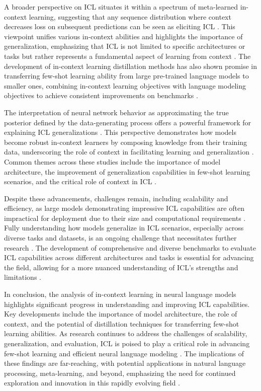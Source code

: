\documentclass[conference]{IEEEtran}
\begin{document}
A broader perspective on ICL situates it within a spectrum of meta-learned in-context learning, suggesting that any sequence distribution where context decreases loss on subsequent predictions can be seen as eliciting ICL \cite{b7}. This viewpoint unifies various in-context abilities and highlights the importance of generalization, emphasizing that ICL is not limited to specific architectures or tasks but rather represents a fundamental aspect of learning from context \cite{b8}. The development of in-context learning distillation methods has also shown promise in transferring few-shot learning ability from large pre-trained language models to smaller ones, combining in-context learning objectives with language modeling objectives to achieve consistent improvements on benchmarks \cite{b9}.

The interpretation of neural network behavior as approximating the true posterior defined by the data-generating process offers a powerful framework for explaining ICL generalizations \cite{b10}. This perspective demonstrates how models become robust in-context learners by composing knowledge from their training data, underscoring the role of context in facilitating learning and generalization \cite{b11}. Common themes across these studies include the importance of model architecture, the improvement of generalization capabilities in few-shot learning scenarios, and the critical role of context in ICL \cite{b12}.

Despite these advancements, challenges remain, including scalability and efficiency, as large models demonstrating impressive ICL capabilities are often impractical for deployment due to their size and computational requirements \cite{b13}. Fully understanding how models generalize in ICL scenarios, especially across diverse tasks and datasets, is an ongoing challenge that necessitates further research \cite{b14}. The development of comprehensive and diverse benchmarks to evaluate ICL capabilities across different architectures and tasks is essential for advancing the field, allowing for a more nuanced understanding of ICL's strengths and limitations \cite{b15}.

In conclusion, the analysis of in-context learning in neural language models highlights significant progress in understanding and improving ICL capabilities. Key developments include the importance of model architecture, the role of context, and the potential of distillation techniques for transferring few-shot learning abilities. As research continues to address the challenges of scalability, generalization, and evaluation, ICL is poised to play a critical role in advancing few-shot learning and efficient neural language modeling \cite{b16}. The implications of these findings are far-reaching, with potential applications in natural language processing, meta-learning, and beyond, emphasizing the need for continued exploration and innovation in this rapidly evolving field \cite{b17}.
\end{document}
